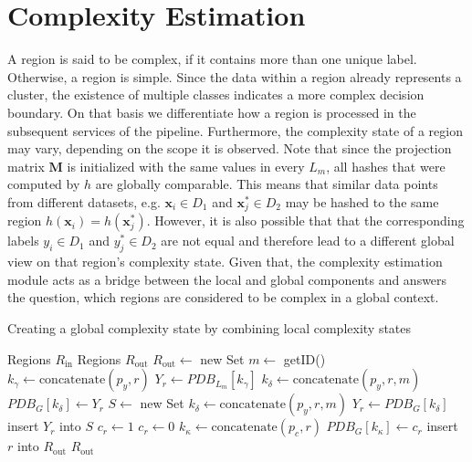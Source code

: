 \section{Complexity Estimation} \label{sec:complexity_estimation}

A region is said to be complex, if it contains more than one unique label. Otherwise, a region is simple. Since the data within a region already represents a cluster, the existence of multiple classes indicates a more complex decision boundary. On that basis we differentiate how a region is processed in the subsequent services of the pipeline. Furthermore, the complexity state of a region may vary, depending on the scope it is observed. Note that since the projection matrix $\bm{M}$ is initialized with the same values in every $L_m$, all hashes that were computed by $h$ are globally comparable. This means that similar data points from different datasets, e.g. $\bm{x}_i \in D_1$ and $\bm{x}_j^* \in D_2$ may be hashed to the same region $h(\bm{x}_i) = h(\bm{x}^*_j)$. However, it is also possible that that the corresponding labels $y_i \in D_1$ and $y^*_j \in D_2$ are not equal and therefore lead to a different global view on that region's complexity state. Given that, the complexity estimation module acts as a bridge between the local and global components and answers the question, which regions are considered to be complex in a global context. 

\begin{algorithm}
   \caption{Creating a global complexity state by combining local complexity states}
   \label{alg:complexity_estimation}

   \begin{algorithmic}[1]
         \REQUIRE Regions $R_{\text{in}}$
         \ENSURE Regions $R_{\text{out}}$
         \STATE $R_{\text{out}} \leftarrow $ new Set
         \STATE $m \leftarrow$ getID() 
            \STATE $k_\gamma \leftarrow \text{concatenate}(p_y, r)$
            \STATE $Y_r \leftarrow PDB_{L_m}[k_\gamma]$
            \STATE $k_\delta \leftarrow \text{concatenate}(p_y, r, m)$
            \STATE $PDB_G[k_\delta] \leftarrow Y_r$
            \STATE $S \leftarrow$ new Set
               \STATE $k_\delta \leftarrow \text{concatenate}(p_y, r, m)$
               \STATE $Y_r \leftarrow PDB_G[k_\delta]$
               \STATE insert $Y_r$ into $S$
            \ENDFOR
               \STATE $c_r \leftarrow 1$ 
            \ELSE 
               \STATE $c_r \leftarrow 0$ 
            \ENDIF
            \STATE $k_\kappa \leftarrow \text{concatenate}(p_c, r)$
               \STATE $PDB_G[k_\kappa] \leftarrow c_r$
               \STATE insert $r$ into $R_{\text{out}}$
            \ENDIF
         \ENDFOR
         \RETURN $R_{\text{out}}$
   \end{algorithmic}
\end{algorithm}

